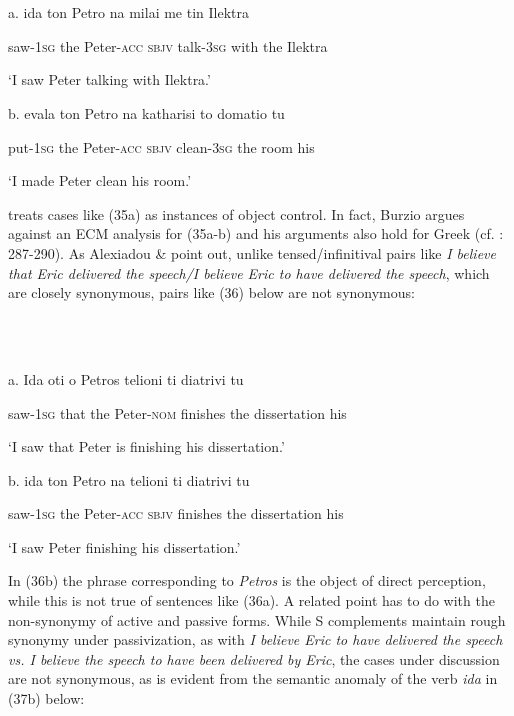 \documentclass[output=paper]{langsci/langscibook}
\begin{document}
\ea%
    \label{ex:key:35}
    \gll\\
        \\
    \glt
    \z

          a.  ida          ton  Petro         na    milai     me   tin Ilektra

    saw{}-\textsc{1sg}  the   Peter{}-\textsc{acc}  \textsc{sbjv} talk-\textsc{3sg} with  the Ilektra

    ‘I saw Peter talking with Ilektra.’

  b.  evala      ton Petro       na     katharisi   to   domatio tu

    put{}-\textsc{1sg}  the Peter{}-\textsc{acc} \textsc{sbjv}   clean-\textsc{3sg}  the  room     his

    ‘I made Peter clean his room.’

\citet{Iatridou1993} treats cases like (35a) as instances of object control. In fact, Burzio argues against an ECM analysis for (35a-b) and his arguments also hold for Greek (cf. \citealt{Burzio1986}: 287-290). As Alexiadou \& \citet{Anagnostopoulou1997} point out, unlike tensed/infinitival pairs like \textit{I believe that Eric delivered the speech/I believe Eric to have delivered the speech}, which are closely synonymous, pairs like (36) below are not synonymous:

\ea%
    \label{ex:key:36}
    \gll\\
        \\
    \glt
    \z

          a.  Ida          oti   o    Petros         telioni   ti      diatrivi       tu

    saw{}-\textsc{1sg}  that  the Peter{}-\textsc{nom}   finishes  the  dissertation his

    ‘I saw that Peter is finishing his dissertation.’

  b.  ida          ton  Petro      na     telioni   ti    diatrivi        tu

    saw{}-\textsc{1sg}  the  Peter{}-\textsc{acc} \textsc{sbjv} finishes the  dissertation his

    ‘I saw Peter finishing his dissertation.’

In (36b) the phrase corresponding to \textit{Petros} is the object of direct perception, while this is not true of sentences like (36a). A related point has to do with the non-synonymy of active and passive forms. While S complements maintain rough synonymy under passivization, as with \textit{I believe Eric to have delivered the speech vs. I believe the speech to have been delivered by Eric}, the cases under discussion are not synonymous, as is evident from the semantic anomaly of the verb \textit{ida} in (37b) below:
\end{document}
